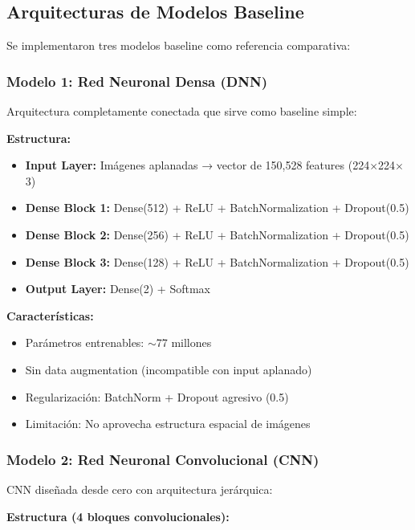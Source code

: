 \documentclass[11pt, a4paper]{article}
\begin{document}
\subsection{Arquitecturas de Modelos Baseline}

Se implementaron tres modelos baseline como referencia comparativa:

\subsubsection{Modelo 1: Red Neuronal Densa (DNN)}

Arquitectura completamente conectada que sirve como baseline simple:

\textbf{Estructura:}
\begin{itemize}
    \item \textbf{Input Layer:} Imágenes aplanadas → vector de 150,528 features (224$\times$224$\times$3)
    \item \textbf{Dense Block 1:} Dense(512) + ReLU + BatchNormalization + Dropout(0.5)
    \item \textbf{Dense Block 2:} Dense(256) + ReLU + BatchNormalization + Dropout(0.5)
    \item \textbf{Dense Block 3:} Dense(128) + ReLU + BatchNormalization + Dropout(0.5)
    \item \textbf{Output Layer:} Dense(2) + Softmax
\end{itemize}

\textbf{Características:}
\begin{itemize}
    \item Parámetros entrenables: $\sim$77 millones
    \item Sin data augmentation (incompatible con input aplanado)
    \item Regularización: BatchNorm + Dropout agresivo (0.5)
    \item Limitación: No aprovecha estructura espacial de imágenes
\end{itemize}

\subsubsection{Modelo 2: Red Neuronal Convolucional (CNN)}

CNN diseñada desde cero con arquitectura jerárquica:

\textbf{Estructura (4 bloques convolucionales):}
\end{document}
